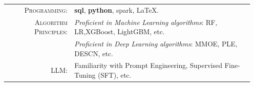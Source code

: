 %
%


 
\renewcommand{\arraystretch}{1.1}

	\begin{tabular}{>{}r>{}p{13cm}} 
		\textsc{Programming:}      &  \textbf{sql}, \textbf{python}, spark, LaTeX.\\  
		\textsc{Algorithm Principles:} & \emph{Proficient in Machine Learning algorithms}: RF, LR,XGBoost, LightGBM, etc. \\
							   &  \emph{Proficient in Deep Learning algorithms}: MMOE, PLE, DESCN, etc. \\
		\textsc{LLM:}	   &  Familiarity with Prompt Engineering, Supervised Fine-Tuning (SFT), etc.  \\
	\end{tabular}
	
